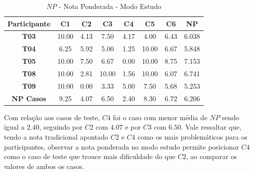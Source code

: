 \begin{table}[htbp]
	\centering
	\caption{$NP$ - Nota Ponderada - Modo Estudo}
	\begin{tabular}{|c|c|c|c|c|c|c|c|}
		\hline
		\rowcolor[HTML]{D9D9D9} 
		\textbf{Participante} & \textbf{C1} & \textbf{C2} & \textbf{C3} & \textbf{C4} & \textbf{C5} & \textbf{C6} & \textbf{NP} \\ \hline
		\rowcolor[HTML]{FFFFFF} 
		\textbf{T03} & 10.00 & 4.13 & 7.50 & 4.17 & 4.00 & 6.43 & 6.038 \\ \hline
		\rowcolor[HTML]{E7E6E6} 
		\textbf{T04} & 6.25 & 5.92 & 5.00 & 1.25 & 10.00 & 6.67 & 5.848 \\ \hline
		\rowcolor[HTML]{FFFFFF} 
		\textbf{T05} & 10.00 & 7.50 & 6.67 & 0.00 & 10.00 & 8.75 & 7.153 \\ \hline
		\rowcolor[HTML]{E7E6E6} 
		\textbf{T08} & 10.00 & 2.81 & 10.00 & 1.56 & 10.00 & 6.07 & 6.741 \\ \hline
		\rowcolor[HTML]{FFFFFF} 
		\textbf{T09} & 10.00 & 0.00 & 3.33 & 5.00 & 7.50 & 5.68 & 5.253 \\ \hline
		\rowcolor[HTML]{D9D9D9} 
		\textbf{NP Casos} & 9.25 & 4.07 & 6.50 & 2.40 & 8.30 & 6.72 & 6.206 \\ \hline
	\end{tabular}
	\label{tab:F3_A4_NP}
\end{table}

Com relação aos casos de teste, $C4$ foi o caso com menor média de $NP$ sendo igual a $2.40$, seguindo por $C2$ com $4.07$ e por $C3$ com $6.50$. %
Vale ressaltar que, tendo a nota tradicional apontado $C2$ e $C4$ como os mais problemáticos para os participantes, observar a nota ponderada no modo estudo permite posicionar $C4$ como o caso de teste que trouce mais dificuldade do que $C2$, ao comparar os valores de ambos os casos.

